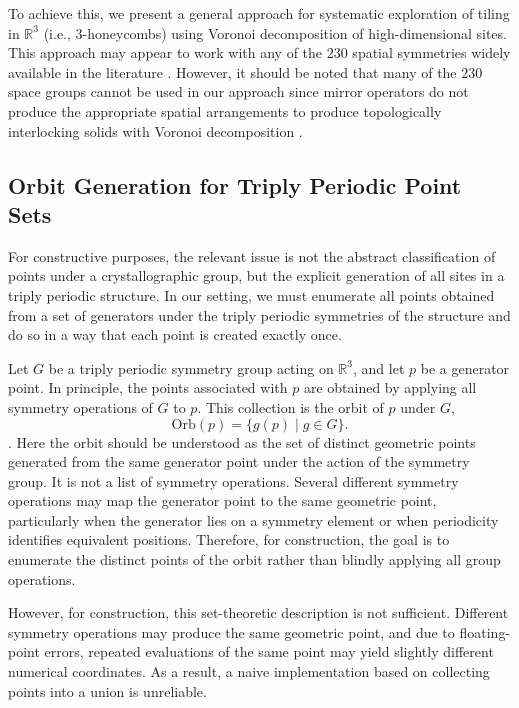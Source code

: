 \documentclass[times,twocolumn,final]{elsarticle}
\begin{document}
To achieve this, we present a general approach for systematic exploration of tiling in $\mathbb{R}^3$ (i.e., 3-honeycombs) using Voronoi decomposition of high-dimensional sites. This approach may appear to work with any of the $230$ spatial symmetries widely available in the literature \cite{fedorov1891symmetry,hahn1983international,barnes2024hypertext}. However, it should be noted that many of the $230$ space groups cannot be used in our approach since mirror operators do not produce the appropriate spatial arrangements to produce topologically interlocking solids with Voronoi decomposition \cite{panchal2023curved}.

\subsection{Orbit Generation for Triply Periodic Point Sets}

For constructive purposes, the relevant issue is not the abstract classification of points under a crystallographic group, but the explicit generation of all sites in a triply periodic structure. In our setting, we must enumerate all points obtained from a set of generators under the triply periodic symmetries of the structure and do so in a way that each point is created exactly once.

Let $G$ be a triply periodic symmetry group acting on $\mathbb{R}^3$, and let $p$ be a generator point. In principle, the points associated with $p$ are obtained by applying all symmetry operations of $G$ to $p$. This collection is the orbit of $p$ under $G$,
\[
\mathrm{Orb}(p)=\{g(p)\mid g\in G\}.
\]
\cite{engel1986geometric,dolbilin2004delone,conway2008symmetries,hahn2005international}. {\color{red}Here the orbit should be understood as the set of distinct geometric points generated from the same generator point under the action of the symmetry group. It is not a list of symmetry operations. Several different symmetry operations may map the generator point to the same geometric point, particularly when the generator lies on a symmetry element or when periodicity identifies equivalent positions. Therefore, for construction, the goal is to enumerate the distinct points of the orbit rather than blindly applying all group operations.} 

However, for construction, this set-theoretic description is not sufficient. Different symmetry operations may produce the same geometric point, and due to floating-point errors, repeated evaluations of the same point may yield slightly different numerical coordinates. As a result, a naive implementation based on collecting points into a union is unreliable.
\end{document}
